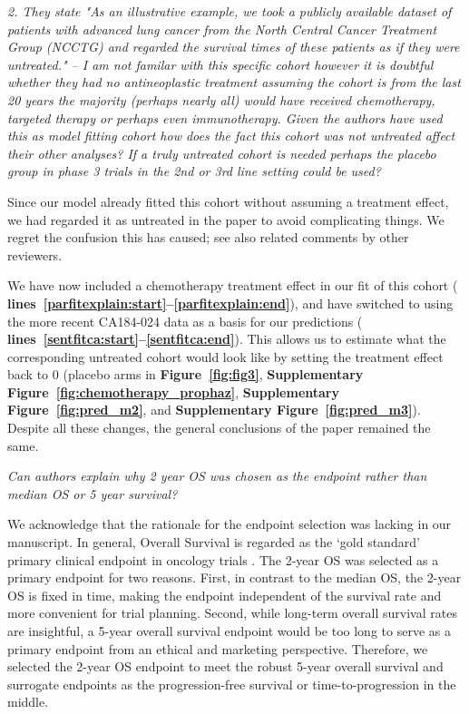 \documentclass{article}
\newcommand{\revr}[1]{{\color{gray} \itshape #1}}
\newcommand{\auth}[1]{{#1}}
\newcommand{\chng}[1]{{\color{blue!70!black} #1}}
\newcommand{\myref}[2]{{\bfseries\color{red!70!black} Figure~\ref{#1}#2}}
\newcommand{\mysupp}[2]{{\bfseries\color{red!70!black} Supplementary Figure~\ref{#1}#2}}
\newcommand{\lr}[1]{{\bfseries\color{red!70!black} lines~\ref{#1:start}--\ref{#1:end}}}
\begin{document}
\revr{2. They state "As an illustrative example, we took a publicly available dataset of patients with advanced lung cancer from the North Central Cancer Treatment Group (NCCTG) and regarded the survival times of these patients as if they were untreated."
– I am not familar with this specific cohort however it is doubtful whether they had no antineoplastic treatment assuming the cohort is from the last 20 years the majority (perhaps nearly all) would have received chemotherapy, targeted therapy or perhaps even immunotherapy. Given the authors have used this as model fitting cohort how does the fact this cohort was not untreated affect their other analyses?
If a truly untreated cohort is needed perhaps the placebo group in phase 3 trials in the 2nd or 3rd line setting could be used?}

\auth{Since our model already fitted this cohort without assuming a treatment effect, we had regarded it as untreated in the paper to avoid complicating things. We regret the confusion this has caused; see also related comments by other reviewers.}

\chng{We have now included a chemotherapy treatment effect in our fit of this cohort (\lr{parfitexplain}), and have switched to using the more recent CA184-024 data as a basis for our predictions (\lr{sentfitca}). This allows us to estimate what the corresponding untreated cohort would look like by setting the treatment effect back to 0 (placebo arms in \myref{fig:fig3}{}, \mysupp{fig:chemotherapy_prophaz}{}, \mysupp{fig:pred_m2}{}, and \mysupp{fig:pred_m3}{}). Despite all these changes, the general conclusions of the paper remained the same.}

\revr{Can authors explain why 2 year OS was chosen as the endpoint rather than median OS or 5 year survival?}

\auth{We acknowledge that the rationale for the endpoint selection was lacking in our manuscript. In general, Overall Survival is regarded as the ‘gold standard’ primary clinical endpoint in oncology trials \cite{pmid33948349}. The 2-year OS was selected as a primary endpoint for two reasons. First, in contrast to the median OS, the 2-year OS is fixed in time, making the endpoint independent of the survival rate and more convenient for trial planning. Second, while long-term overall survival rates are insightful, a 5-year overall survival endpoint would be too long to serve as a primary endpoint from an ethical and marketing perspective. Therefore, we selected the 2-year OS endpoint to meet the robust 5-year overall survival and surrogate endpoints as the progression-free survival or time-to-progression in the middle.}
\end{document}
